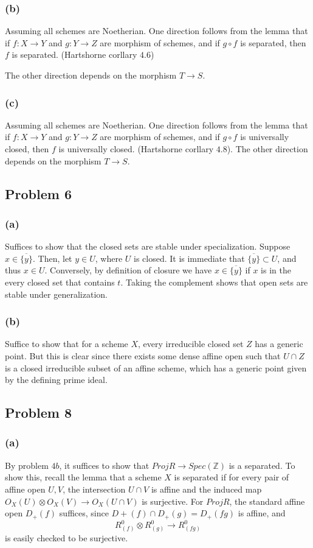 \documentclass{article}
\theoremstyle{definition}
\theoremstyle{definition}
\theoremstyle{definition}
\theoremstyle{definition}
\theoremstyle{definition}
\theoremstyle{definition}
\theoremstyle{definition}
\begin{document}
\subsubsection*{(b)}
Assuming all schemes are Noetherian. One direction follows from the lemma that if $f: X\to Y$ and $g:Y\to Z$ are morphism of schemes, and if $g\circ f$ is separated, then $f$ is separated. (Hartshorne corllary $4.6$)

The other direction depends on the morphism $T\to S$.

\subsubsection*{(c)}
Assuming all schemes are Noetherian. One direction follows from the lemma that if $f: X\to Y$ and $g:Y\to Z$ are morphism of schemes, and if $g\circ f$ is universally closed, then $f$ is universally closed. (Hartshorne corllary $4.8$). The other direction depends on the morphism $T\to S$. 

\subsection*{Problem 6}
\subsubsection*{(a)}
Suffices to show that the closed sets are stable under specialization. Suppose $x\in \overline{\{y\}}$. Then, let $y\in U$, where $U$ is closed. It is immediate that $\overline{\{y\}}\subset U$, and thus $x\in U$. Conversely, by definition of closure we have $x\in \overline{\{y\}}$ if $x$ is in the every closed set that contains $t$. Taking the complement shows that open sets are stable under generalization. 

\subsubsection*{(b)}
Suffice to show that for a scheme $X$, every irreducible closed set $Z$ has a generic point. But this is clear since there exists some dense affine open such that $U\cap Z$ is a closed irreducible subset of an affine scheme, which has a generic point given by the defining prime ideal.

\subsection*{Problem 8}
\subsubsection*{(a)}
By problem $4b$, it suffices to show that $Proj R\to Spec(\mathbb{Z})$ is a separated. To show this, recall the lemma that a scheme $X$ is separated if for every pair of affine open $U,V$, the intersection $U\cap V$ is affine and the induced map $O_X(U)\otimes O_X(V)\to O_X(U\cap V)$ is surjective. For $Proj R$, the standard affine open $D_+(f)$ suffices, since $D+(f)\cap D_+(g)=D_+(fg)$ is affine, and 
\[R^0_{(f)}\otimes R^0_{(g)}\to R^0_{(fg)}\]
is easily checked to be surjective. 
\end{document}
